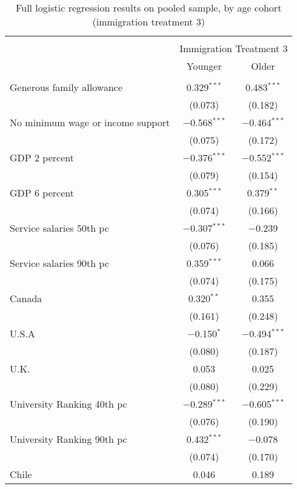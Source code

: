 
\begin{table}[!htbp] \centering 
  \caption{Full logistic regression results on pooled sample, by age cohort (immigration treatment 3)} 
  \label{tab:age_full_3} 
\footnotesize 
\begin{tabular}{@{\extracolsep{5pt}}lcc} 
\\[-1.8ex]\hline 
\hline \\[-1.8ex] 
 & \multicolumn{2}{c}{Immigration Treatment 3} \\ 
\cline{2-3} 
 & Younger & Older \\ 
\hline \\[-1.8ex] 
 Generous family allowance & 0.329$^{***}$ & 0.483$^{***}$ \\ 
  & (0.073) & (0.182) \\ 
  No minimum wage or income support & $-$0.568$^{***}$ & $-$0.464$^{***}$ \\ 
  & (0.075) & (0.172) \\ 
  GDP 2 percent & $-$0.376$^{***}$ & $-$0.552$^{***}$ \\ 
  & (0.079) & (0.154) \\ 
  GDP 6 percent & 0.305$^{***}$ & 0.379$^{**}$ \\ 
  & (0.074) & (0.166) \\ 
  Service salaries 50th pc & $-$0.307$^{***}$ & $-$0.239 \\ 
  & (0.076) & (0.185) \\ 
  Service salaries 90th pc & 0.359$^{***}$ & 0.066 \\ 
  & (0.074) & (0.175) \\ 
  Canada & 0.320$^{**}$ & 0.355 \\ 
  & (0.161) & (0.248) \\ 
  U.S.A & $-$0.150$^{*}$ & $-$0.494$^{***}$ \\ 
  & (0.080) & (0.187) \\ 
  U.K. & 0.053 & 0.025 \\ 
  & (0.080) & (0.229) \\ 
  University Ranking 40th pc & $-$0.289$^{***}$ & $-$0.605$^{***}$ \\ 
  & (0.076) & (0.190) \\ 
  University Ranking 90th pc & 0.432$^{***}$ & $-$0.078 \\ 
  & (0.074) & (0.170) \\ 
  Chile & 0.046 & 0.189 \\ 

\end{tabular}
\end{table}

